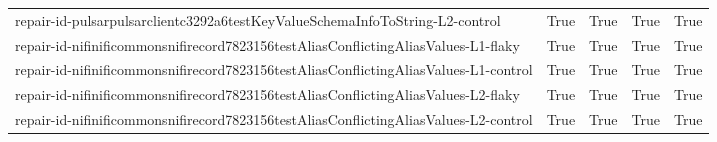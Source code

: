 \begin{table}[t]
\begin{tabular}{lllll}
repair-id-pulsarpulsarclientc3292a6testKeyValueSchemaInfoToString-L2-control & True & True & True & True \\
repair-id-nifinificommonsnifirecord7823156testAliasConflictingAliasValues-L1-flaky & True & True & True & True \\
repair-id-nifinificommonsnifirecord7823156testAliasConflictingAliasValues-L1-control & True & True & True & True \\
repair-id-nifinificommonsnifirecord7823156testAliasConflictingAliasValues-L2-flaky & True & True & True & True \\
repair-id-nifinificommonsnifirecord7823156testAliasConflictingAliasValues-L2-control & True & True & True & True \\
\bottomrule
\end{tabular}
\end{table}
